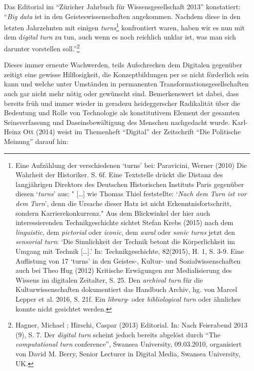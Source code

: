\documentclass[a4paper,
fontsize=11pt,
oneside,
numbers=noperiodatend,
parskip=half-,
bibliography=totoc,
final
]{scrartcl}
\begin{document}
Das Editorial im \enquote{Züricher Jahrbuch für Wissensgesellschaft
2013} konstatiert: \enquote{\emph{Big data} ist in den
Geisteswissenschaften angekommen. Nachdem diese in den letzten
Jahrzehnten mit einigen \emph{turns}\footnote{Eine Aufzählung der
  verschiedenen \enquote{turns} bei: Paravicini, Werner (2010) Die
  Wahrheit der Historiker. S. 6f. Eine Textstelle drückt die Distanz des
  langjährigen Direktors des Deutschen Historischen Instituts Paris
  gegenüber diesen \enquote{\emph{turns}} aus: " {[}\ldots{}{]} wie
  Thomas Thiel feststellte: \enquote{\emph{Nach dem Turn ist vor dem
  Turn}}, denn die Ursache dieser Hatz ist nicht Erkenntnisfortschritt,
  sondern Karrierekonkurrenz." Aus dem Blickwinkel der hier auch
  interessierenden Technikgeschichte sichtet Stefan Krebs (2015) nach
  dem \emph{linguistic}, dem \emph{pictorial} oder \emph{iconic}, dem
  \emph{aural} oder \emph{sonic turns} jetzt den \emph{sensorial turn}:
  \enquote{Die Sinnlichkeit der Technik betont die Körperlichkeit im
  Umgang mit Technik {[}\ldots{}{]}.} In: Technikgeschichte, 82(2015),
  H. 1, S. 3-9. Eine Auflistung von 17 \enquote{turns} in den Geistes-,
  Kultur- und Sozialwissenschaften auch bei Theo Hug (2012) Kritische
  Erwägungen zur Medialisierung des Wissens im digitalen Zeitalter, S.
  25. Den \emph{archival turn} für die Kulturwissenschaften dokumentiert
  das Handbuch Archiv, hg. von Marcel Lepper et al. 2016, S. 21f. Ein
  \emph{library}- oder \emph{bibliological turn} oder ähnliches konnte
  nicht gesichtet werden.} konfrontiert waren, haben wir es nun mit dem
d\emph{igital turn} zu tun, auch wenn es noch reichlich unklar ist, was
man sich darunter vorstellen soll.}\footnote{Hagner, Michael ; Hirschi,
  Caspar (2013) Editorial. In: Nach Feierabend 2013 (9), S. 7. Der
  \emph{digital turn} scheint jedoch bereits abgelöst durch \enquote{The
  \emph{computational turn} conference}, Swansea University, 09.03.2010,
  organisiert von David M. Berry, Senior Lecturer in Digital Media,
  Swansea University, UK.}

Dieses immer erneute Wachwerden, teils Aufschrecken dem Digitalen
gegenüber zeitigt eine gewisse Hilflosigkeit, die Konzeptbildungen per
se nicht förderlich sein kann und welche unter Umständen in permanenten
Transformationsgesellschaften auch gar nicht mehr nötig oder gewünscht
sind. Bemerkenswert ist dabei, dass bereits früh und immer wieder in
geradezu heideggerscher Radikalität über die Bedeutung und Rolle von
Technologie als konstitutivem Element der gesamten Seinsverfassung und
Daseinsbewältigung des Menschen nachgedacht wurde. Karl-Heinz Ott (2014)
weist im Themenheft \enquote{Digital} der Zeitschrift \enquote{Die
Politische Meinung} darauf hin:
\end{document}
